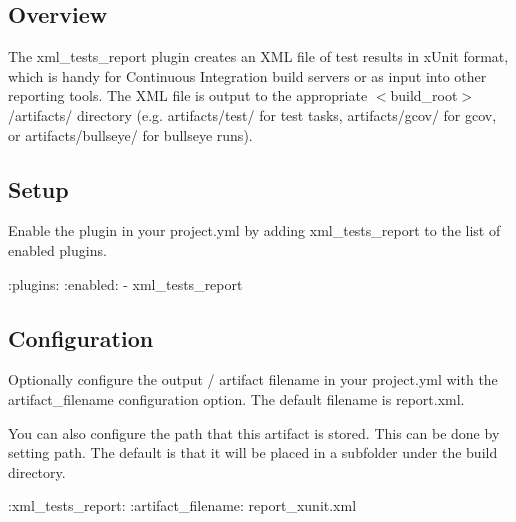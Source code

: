 \subsection*{Overview}

The xml\+\_\+tests\+\_\+report plugin creates an X\+ML file of test results in x\+Unit format, which is handy for Continuous Integration build servers or as input into other reporting tools. The X\+ML file is output to the appropriate {\ttfamily $<$build\+\_\+root$>$/artifacts/} directory (e.\+g. {\ttfamily artifacts/test/} for test tasks, {\ttfamily artifacts/gcov/} for gcov, or {\ttfamily artifacts/bullseye/} for bullseye runs).

\subsection*{Setup}

Enable the plugin in your project.\+yml by adding {\ttfamily xml\+\_\+tests\+\_\+report} to the list of enabled plugins.


\begin{DoxyCode}
:plugins:
  :enabled:
    - xml\_tests\_report
\end{DoxyCode}


\subsection*{Configuration}

Optionally configure the output / artifact filename in your project.\+yml with the {\ttfamily artifact\+\_\+filename} configuration option. The default filename is {\ttfamily report.\+xml}.

You can also configure the path that this artifact is stored. This can be done by setting {\ttfamily path}. The default is that it will be placed in a subfolder under the {\ttfamily build} directory.


\begin{DoxyCode}
:xml\_tests\_report:
  :artifact\_filename: report\_xunit.xml
\end{DoxyCode}
 